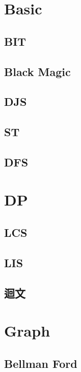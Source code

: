 \section{Basic}
    \subsection{BIT}
        
    \subsection{Black Magic}
        
    \subsection{DJS}
            
    \subsection{ST}
        
    \subsection{DFS}
        

\section{DP}
    \subsection{LCS}
        
    \subsection{LIS}
        
    \subsection{迴文}
        

\section{Graph}
    \subsection{Bellman Ford}
        
